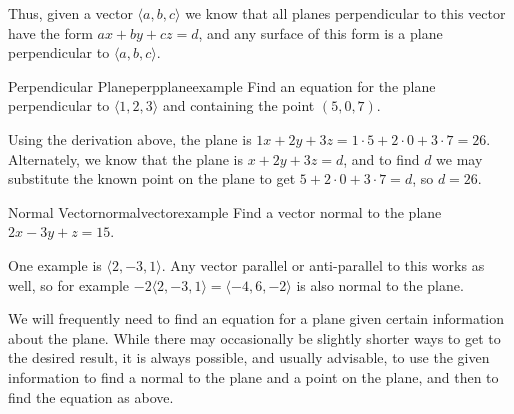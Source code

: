 Thus, given a vector $\langle a,b,c\rangle$ we know that all planes
perpendicular to this vector have the form $ax+by+cz=d$, and any surface
of this form is a plane perpendicular to $\langle a,b,c\rangle$.

\begin{example}{Perpendicular Plane}{perpplaneexample}
Find an equation for the plane perpendicular to $\langle 1,2,3\rangle$
and containing the point $(5,0,7)$.
\end{example}
\begin{solution}
Using the derivation above, 
the plane is $1x+2y+3z=1\cdot5+2\cdot0+3\cdot7=26$. Alternately, we
know that the plane is $x+2y+3z=d$, and to find $d$ we may substitute
the known point on the plane to get $5+2\cdot0+3\cdot7=d$, so $d=26$.
\end{solution}

\begin{example}{Normal Vector}{normalvectorexample}
Find a vector normal to the plane $2x-3y+z=15$.
\end{example}
\begin{solution}
One example is $\langle 2, -3,1\rangle$. Any vector parallel or
anti-parallel to this works as well, so for example
$-2\langle 2, -3,1\rangle=\langle -4,6,-2\rangle$ is also normal to the plane.
\end{solution}

We will frequently need to find an equation for a plane given certain
information about the plane. While there may occasionally be slightly
shorter ways to get to the desired result, it is always possible, and
usually advisable, to use the given information to find a normal to
the plane and a point on the plane, and then to find the equation as
above. 

